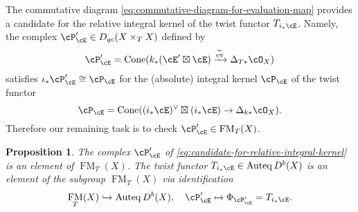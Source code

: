 \documentclass[12pt]{amsart}
\numberwithin{equation}{section}
\theoremstyle{plain}
\newtheorem{proposition}[theorem]{Proposition}
\theoremstyle{definition}
\DeclareMathOperator{\Auteq}{\mathrm{Auteq}}
\DeclareMathOperator{\Cone}{\mathrm{Cone}}
\DeclareMathOperator{\ev}{\mathrm{ev}}
\DeclareMathOperator{\FM}{\mathrm{FM}}
\begin{document}
The commutative diagram \eqref{eq:commutative-diagram-for-evaluation-map} provides a candidate for the relative integral kernel of the twist functor $T_{i_*{\cE}}$.
Namely, the complex $\cP'_{\cE} \in D_{qc}(X \times_T X)$ defined by
\begin{equation}\label{eq:candidate-for-relative-integral-kernel}
    \cP'_{\cE} = \Cone(k_*(\cE' \boxtimes \cE) \xrightarrow{\widetilde{\ev}} \Delta_{T*}\cO_X)
\end{equation}
satisfies $\iota_* \cP'_{\cE} \cong \cP_{\cE}$ for the (absolute) integral kernel $\cP_{\cE}$ of the twist functor
\begin{equation}
    \cP_{\cE} = \Cone((i_*{\cE})^\vee \boxtimes (i_*{\cE}) \to \Delta_{k*}\cO_X).
\end{equation}
Therefore our remaining task is to check $\cP'_{\cE} \in \FM_T(X)$.
\begin{proposition}\label{prop:twist-functor-is-in-FM}
    The complex $\cP'_{\cE}$ of \eqref{eq:candidate-for-relative-integral-kernel} is an element of $\FM_T(X)$.
    The twist functor $T_{i_*{\cE}} \in \Auteq D^b(X)$ is an element of the subgroup $\FM_T(X)$ via identification
    \begin{equation}
        \FM_T(X) \hookrightarrow \Auteq D^b(X), \quad \cP'_{\cE} \mapsto \Phi_{\cP'_{\cE}} = T_{i_*{\cE}}.
    \end{equation}
\end{proposition}
\end{document}
